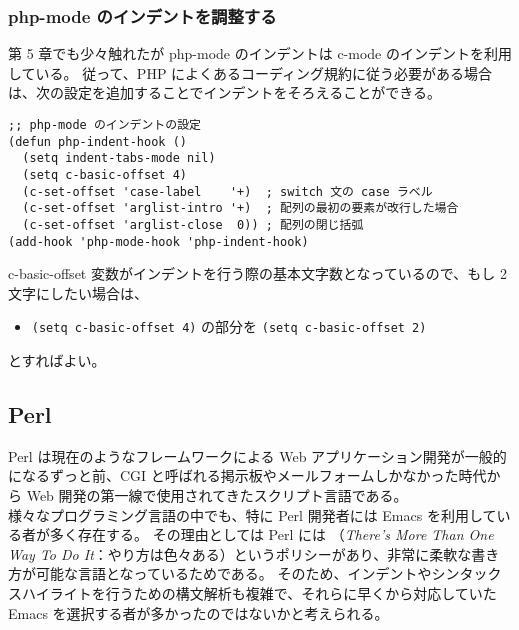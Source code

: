 \subsubsection{php-mode のインデントを調整する}
第 5 章でも少々触れたが php-mode のインデントは c-mode のインデントを利用している。
従って、PHP によくあるコーディング規約に従う必要がある場合は、次の設定を追加することでインデントをそろえることができる。
\begin{mdframed}[roundcorner=0.50zw,leftmargin=3.00zw,rightmargin=3.00zw,skipabove=0.40zw,skipbelow=0.40zw,innertopmargin=4.00pt,innerbottommargin=4.00pt,innerleftmargin=5.00pt,innerrightmargin=5.00pt,linecolor=gray!020,linewidth=0.50pt,backgroundcolor=gray!20]
\begin{verbatim}
;; php-mode のインデントの設定
(defun php-indent-hook ()
  (setq indent-tabs-mode nil)
  (setq c-basic-offset 4)
  (c-set-offset 'case-label    '+)  ; switch 文の case ラベル
  (c-set-offset 'arglist-intro '+)  ; 配列の最初の要素が改行した場合
  (c-set-offset 'arglist-close  0)) ; 配列の閉じ括弧
(add-hook 'php-mode-hook 'php-indent-hook)
\end{verbatim}
\end{mdframed}
c-basic-offset 変数がインデントを行う際の基本文字数となっているので、もし 2 文字にしたい場合は、
\begin{itemize}\setlength{\leftskip}{-1.00zw}%
\item[] \texttt{(setq c-basic-offset 4)} の部分を \texttt{(setq c-basic-offset 2)}
\end{itemize}
とすればよい。
\subsection{Perl}
Perl は現在のようなフレームワークによる Web アプリケーション開発が一般的になるずっと前、CGI と呼ばれる掲示板やメールフォームしかなかった時代から Web 開発の第一線で使用されてきたスクリプト言語である。\\

様々なプログラミング言語の中でも、特に Perl 開発者には Emacs を利用している者が多く存在する。
その理由としては Perl には （\emph{There's More Than One Way To Do It}：やり方は色々ある）というポリシーがあり、非常に柔軟な書き方が可能な言語となっているためである。
そのため、インデントやシンタックスハイライトを行うための構文解析も複雑で、それらに早くから対応していた Emacs を選択する者が多かったのではないかと考えられる。
